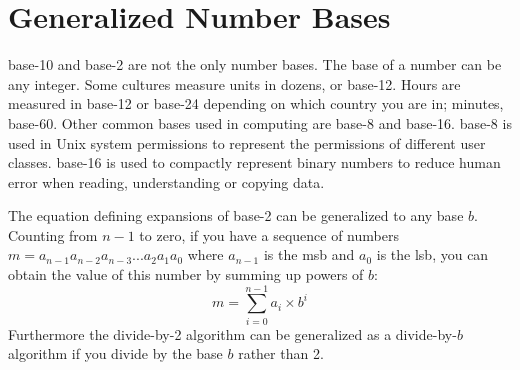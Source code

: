 \begin{figure}[t]
\end{figure}

\section{Generalized Number Bases\label{sec:numbers:bases}}

\Gls{base-10} and \gls{base-2} are not the only number bases. The base of a number can be any 
integer. Some cultures measure units in dozens, or base-12. Hours are measured in base-12 or 
base-24 depending on which country you are in; minutes, base-60. Other common bases used in 
computing are \gls{base-8} and \gls{base-16}. \Gls{base-8} is used in Unix system permissions 
to represent the permissions of different user classes. \Gls{base-16} is used to compactly 
represent binary numbers to reduce human error when reading, understanding or copying data.

The equation defining expansions of \gls{base-2} can be generalized to any base $b$. Counting from $n-1$ 
to zero, if you have a sequence of numbers $m = a_{n-1}a_{n-2}a_{n-3}...a_2a_1a_0$ 
where $a_{n-1}$ is the \gls{msb} and $a_0$ is the \gls{lsb}, you can obtain the value of this number 
by summing up powers of $b$:
%
\begin{equation}\label{eq:basen}
    m = \sum_{i=0}^{n-1} a_i \times b^i
\end{equation}
%
Furthermore the divide-by-2 algorithm can be generalized as a divide-by-$b$ algorithm if you divide by the base $b$ rather than 2.

